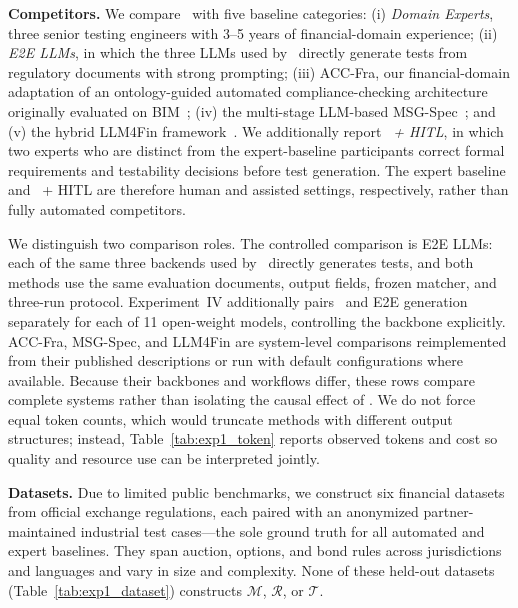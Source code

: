 \noindent
\textbf{Competitors.}
We compare \ourtool\ with five baseline categories: (i) \textit{Domain
Experts}, three senior testing engineers with 3--5 years of financial-domain
experience; (ii) \textit{E2E LLMs}, in which the three LLMs used by \ourtool\
directly generate tests from regulatory documents with strong prompting;
(iii) ACC-Fra, our financial-domain adaptation of an ontology-guided automated
compliance-checking architecture originally evaluated on BIM~\cite{chen2024automated}; (iv) the multi-stage
LLM-based MSG-Spec~\cite{milchevski2025multi}; and (v) the hybrid LLM4Fin
framework~\cite{xue2024llm4fin}. We additionally report
\textit{\ourtool\ + HITL}, in which two experts who are distinct from the
expert-baseline participants correct formal requirements and testability
decisions before test generation. The expert baseline and \ourtool\ + HITL are
therefore human and assisted settings, respectively, rather than fully
automated competitors.

We distinguish two comparison roles. The controlled comparison is E2E LLMs:
each of the same three backends used by \ourtool\ directly generates tests,
and both methods use the same evaluation documents, output fields, frozen
matcher, and three-run protocol. Experiment~IV additionally pairs \ourtool\
and E2E generation separately for each of 11 open-weight models, controlling
the backbone explicitly. ACC-Fra, MSG-Spec, and LLM4Fin are system-level
comparisons reimplemented from their published descriptions or run with
default configurations where available. Because their backbones and workflows
differ, these rows compare complete systems rather than isolating the causal
effect of \ourtool. We do not force
equal token counts, which would truncate methods with different output
structures; instead, Table~\ref{tab:exp1_token} reports observed tokens and
cost so quality and resource use can be interpreted jointly.

\noindent
\textbf{Datasets.} 
Due to limited public benchmarks, we construct six financial datasets from
official exchange regulations, each paired with an anonymized partner-maintained
industrial test cases---the sole ground truth for all automated and expert
baselines. They span auction, options, and bond rules across jurisdictions and
languages and vary in size and complexity. None of these held-out datasets
(Table~\ref{tab:exp1_dataset}) constructs $\mathcal{M}$, $\mathcal{R}$, or
$\mathcal{T}$.

